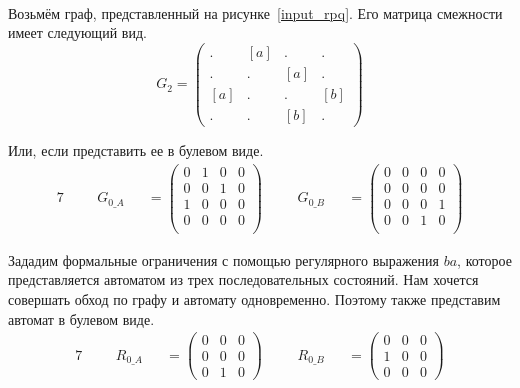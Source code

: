 \begin{example}
  \begin{align}
    \label{input_rpq}
        
    \end{align}
  
  Возьмём граф, представленный на рисунке~\ref{input_rpq}.
  Его матрица смежности имеет следующий вид.
  \[ G_2 =
  \begin{pmatrix}
  . & [a] & . & . \\
  . & . & [a] & . \\
  [a] & . & . & [b] \\
  . & . & [b] & .
  \end{pmatrix}
  \]
  
  Или, если представить ее в булевом виде.
  \begin{alignat*}{7}
  & &&G_{0\_A} &&= \begin{pmatrix}
  0 & 1       & 0 & 0       \\
  0 & 0 & 1       & 0 \\
  1  & 0 & 0 & 0       \\
  0       & 0 & 0 & 0 \\
  \end{pmatrix} \ \ \ \ &&G_{0\_B} &&= \begin{pmatrix}
  0 & 0       & 0 & 0       \\
  0       & 0 & 0       & 0 \\
  0  & 0 & 0 & 1       \\
  0       & 0 & 1 & 0 \\
  \end{pmatrix}
  \end{alignat*}

  Зададим формальные ограничения с помощью регулярного выражения $ba$, которое представляется автоматом из трех последовательных состояний.
  Нам хочется совершать обход по графу и автомату одновременно. Поэтому также представим автомат в булевом виде.
  \begin{alignat*}{7}
    & &&R_{0\_A} &&= \begin{pmatrix}
      0 & 0 & 0 \\
      0 & 0 & 0 \\
      0 & 1 & 0 
      \end{pmatrix} \ \ \ \ &&R_{0\_B} &&= \begin{pmatrix}
        0 & 0 & 0 \\
        1 & 0 & 0 \\
        0 & 0 & 0 
        \end{pmatrix}
    \end{alignat*}


\end{example}
